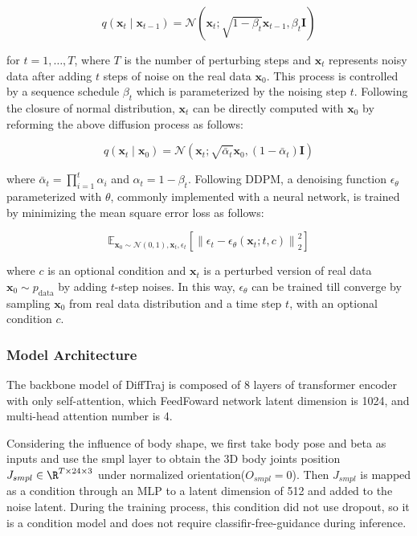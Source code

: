 \documentclass{article}
\begin{document}
\[
q(\mathbf{x}_t \mid \mathbf{x}_{t-1}) = \mathcal{N}(\mathbf{x}_t; \sqrt{1 - \beta_t}\mathbf{x}_{t-1}, \beta_t\mathbf{I})
\]

for $t = 1, \ldots, T$, where $T$ is the number of perturbing steps and $\mathbf{x}_t$ represents noisy data after adding $t$ steps of noise on the real data $\mathbf{x}_0$. This process is controlled by a sequence schedule $\beta_t$ which is parameterized by the noising step $t$. Following the closure of normal distribution, $\mathbf{x}_t$ can be directly computed with $\mathbf{x}_0$ by reforming the above diffusion process as follows:

\[
q(\mathbf{x}_t \mid \mathbf{x}_0) = \mathcal{N}(\mathbf{x}_t; \sqrt{\bar{\alpha}_t}\mathbf{x}_0, (1 - \bar{\alpha}_t)\mathbf{I})
\]

where $\bar{\alpha}_t = \prod_{i=1}^t \alpha_i$ and $\alpha_t = 1 - \beta_t$. Following DDPM, a denoising function $\epsilon_\theta$ parameterized with $\theta$, commonly implemented with a neural network, is trained by minimizing the mean square error loss as follows:

\[
\mathbb{E}_{\mathbf{x}_0 \sim \mathcal{N}(0,1), \mathbf{x}_t, \epsilon_t}\left[ \left\| \epsilon_t - \epsilon_\theta(\mathbf{x}_t; t, c) \right\|_2^2 \right] 
\]

where $c$ is an optional condition and $\mathbf{x}_t$ is a perturbed version of real data $\mathbf{x}_0 \sim p_{\text{data}}$ by adding $t$-step noises. In this way, $\epsilon_\theta$ can be trained till converge by sampling $\mathbf{x}_0$ from real data distribution and a time step $t$, with an optional condition $c$.

\subsubsection{Model Architecture}\label{model-architecture}

The backbone model of DiffTraj is composed of  8 layers of transformer encoder with only self-attention, which FeedFoward network latent dimension is 1024, and multi-head attention number is 4.

Considering the influence of body shape, we first take body pose and beta as inputs and use the smpl layer to obtain the 3D body joints position $J_{smpl} \in \R^{T \times 24 \times 3}$ under normalized orientation($O_{smpl}=0$). Then $J_{smpl}$ is mapped as a condition through an MLP to a latent dimension of 512 and added to the noise latent. During the training process, this condition did not use dropout, so it is a condition model and does not require classifir-free-guidance during inference.
\end{document}
